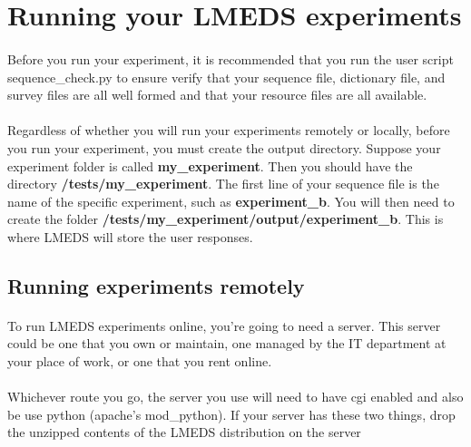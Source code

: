 
\section{Running your LMEDS experiments}

\paragraph{}
Before you run your experiment, it is recommended that you run the user script sequence\_check.py to ensure verify that your sequence file, dictionary file, and survey files are all well formed and that your resource files are all available.


\paragraph{}
Regardless of whether you will run your experiments remotely or locally, before you run your experiment, you must create the output directory.  Suppose your experiment folder is called \textbf{my\_experiment}.  Then you should have the directory \textbf{/tests/my\_experiment}.  The first line of your sequence file is the name of the specific experiment, such as \textbf{experiment\_b}.  You will then need to create the folder \textbf{/tests/my\_experiment/output/experiment\_b}.  This is where LMEDS will store the user responses.


\subsection{Running experiments remotely}

\paragraph{}
To run LMEDS experiments online, you're going to need a server.  This server could be one that you own or maintain, one managed by the IT department at your place of work, or one that you rent online.

\paragraph{}
Whichever route you go, the server you use will need to have cgi enabled and also be use python (apache's mod\_python).  If your server has these two things, drop the unzipped contents of the LMEDS distribution on the server

